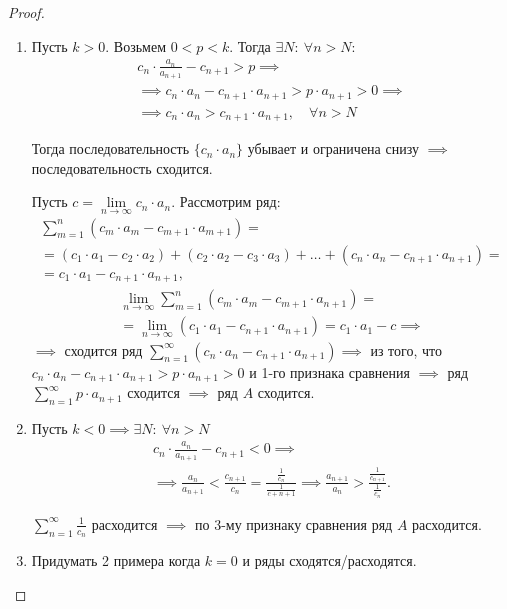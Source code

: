 \begin{proof}\leavevmode
    \begin{enumerate}
        \item Пусть $k > 0$. Возьмем $0 < p < k$. Тогда $\exists N : \ \forall n > N$:
              \begin{multline*}
                  c_n \cdot \frac{a_n}{a_{n+1}} - c_{n+1}>p \implies \\
                  \implies c_n \cdot a_n - c_{n+1} \cdot a_{n+1} > p \cdot a_{n+1} > 0 \implies \\
                  \implies c_n \cdot a_n > c_{n+1} \cdot a_{n+1}, \quad \forall n > N
              \end{multline*}

              Тогда последовательность $\{c_n\cdot a_n\}$ убывает и ограничена снизу $\implies$ последовательность сходится.

              Пусть $c=\underset{n\rightarrow\infty}{\lim}c_n\cdot a_n$. Рассмотрим ряд:
              \begin{multline*}
                  \sum_{m=1}^{n}(c_m\cdot a_m - c_{m+1}\cdot a_{m+1}) = \\
                  = (c_1 \cdot a_1 - c_2 \cdot a_2) + (c_2 \cdot a_2 - c_3 \cdot a_3) + \ldots + (c_n \cdot a_n - c_{n+1}\cdot a_{n+1}) = \\
                  = c_1 \cdot a_1 - c_{n+1} \cdot a_{n+1},
              \end{multline*}
              \begin{multline*}
                  \underset{n\rightarrow\infty}{\lim}\sum_{m=1}^{n}(c_m \cdot a_m - c_{m+1} \cdot a_{n+1}) = \\
                  = \underset{n\rightarrow\infty}{\lim}(c_1 \cdot a_1 - c_{n+1} \cdot a_{n+1}) = c_1 \cdot a_1 - c \implies
              \end{multline*}
              $\implies$ сходится ряд $\sum_{n=1}^{\infty}(c_n \cdot a_n - c_{n+1} \cdot a_{n+1}) \implies$ из того, что $c_n \cdot a_n - c_{n+1} \cdot a_{n+1} > p \cdot a_{n+1} > 0$ и 1-го признака сравнения $\implies$ ряд $\sum_{n=1}^{\infty}p\cdot a_{n+1}$ сходится $\implies$ ряд $A$ сходится.

        \item Пусть $k < 0 \implies \exists N: \ \forall n > N$
              \begin{multline*}
                  c_n \cdot \frac{a_n}{a_{n+1}} - c_{n+1} < 0 \implies \\
                  \implies \frac{a_n}{a_{n+1}} < \frac{c_{n+1}}{c_n} = \frac{\frac{1}{c_n}}{\frac{1}{c+{n+1}}} \implies \frac{a_{n+1}}{a_{n}} > \frac{\frac{1}{c_{n+1}}}{\frac{1}{c_n}}.
              \end{multline*}

              $\sum_{n=1}^{\infty}\frac{1}{c_n}$ расходится $\implies$ по 3-му признаку сравнения ряд $A$ расходится.

        \item Придумать 2 примера когда $k=0$ и ряды сходятся/расходятся.
    \end{enumerate}
\end{proof}

